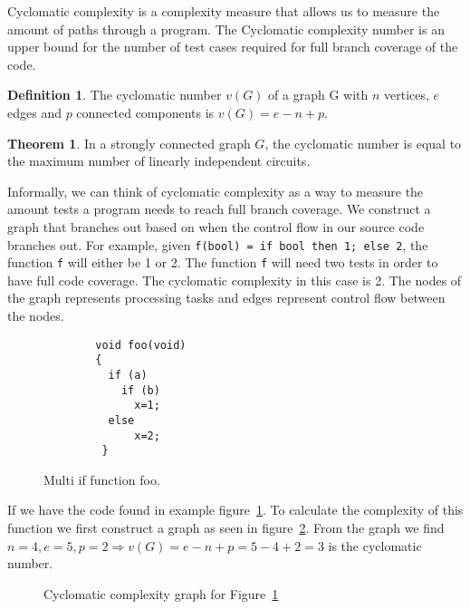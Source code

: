 \documentclass[12pt]{article}
\theoremstyle{definition}
\newtheorem*{definition}{Definition}
\theoremstyle{theorem}
\newtheorem*{theorem}{Theorem}
\begin{document}
Cyclomatic complexity is a complexity measure that allows us to measure the
amount of paths through a program. The Cyclomatic complexity number is an upper
bound for the number of test cases required for full branch coverage of the
code. 

\theoremstyle{definition}
\begin{definition}
The cyclomatic number $v(G)$ of a graph G with $n$ vertices, $e$ edges and $p$
connected components is $v(G) = e - n + p$.
\end{definition}

\begin{theorem}
In a strongly connected graph $G$, the cyclomatic number is equal to the
maximum number of linearly independent circuits.~\cite{McCabe}
\end{theorem}

Informally, we can think of cyclomatic complexity as a way to measure the amount
tests a program needs to reach full branch coverage. We construct a graph that
branches out based on when the control flow in our source code branches out. For
example, given \texttt{f(bool) = if bool then 1; else 2}, the function
\texttt{f} will either be 1 or 2. The function \texttt{f} will need two tests in
order to have full code coverage. The cyclomatic complexity in this case is 2.
The nodes of the graph represents processing tasks and edges represent control
flow between the nodes. 

\begin{figure}[H]
    \begin{lstlisting}
        void foo(void)
        {
          if (a)
            if (b) 
              x=1;
          else
              x=2;
         }
    \end{lstlisting}
    \caption{Multi if function foo.}\label{c1excode}
\end{figure}

If we have the code found in example figure~\ref{c1excode}. To calculate the
complexity of this function we first construct a graph as seen in
figure~\ref{fig:c1exgraph}. From the graph we find $n=4, e=5, p=2\Rightarrow
v(G)=e-n+p=5-4+2=3$ is the cyclomatic number.

\begin{figure}[H]
    \centering
    \caption{Cyclomatic complexity graph for Figure~\ref{c1excode}}\label{fig:c1exgraph}
\end{figure}
\end{document}
